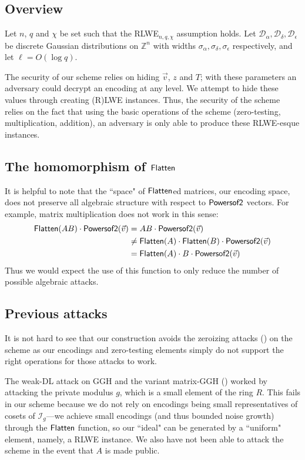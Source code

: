 \subsection{Overview}

Let $n$, $q$ and $\chi$ be set such that the RLWE$_{n,q,\chi}$ assumption holds.  Let $\mathcal{D}_\alpha, \mathcal{D}_\delta, \mathcal{D}_\epsilon$ be discrete Gaussian distributions on $\mathbb{Z}^n$ with widths $\sigma_\alpha, \sigma_\delta, \sigma_\epsilon$ respectively, and let $\ell = O(\log q)$.  

The security of our scheme relies on hiding $\vec{v}$, $z$ and $T$; with these parameters an adversary could decrypt an encoding at any level.  We attempt to hide these values through creating (R)LWE instances.  Thus, the security of the scheme relies on the fact that using the basic operations of the scheme (zero-testing, multiplication, addition), an adversary is only able to produce these RLWE-esque instances.  

\subsection{The homomorphism of $\mathsf{Flatten}$}

It is helpful to note that the ``space" of $\mathsf{Flatten}$ed matrices, our encoding space, does not preserve all algebraic structure with respect to $\mathsf{Powersof2}$ vectors.  For example, matrix multiplication does not work in this sense:
\begin{align*}
\mathsf{Flatten}(AB)\cdot \mathsf{Powersof2}(\vec{v}) &= AB \cdot \mathsf{Powersof2}(\vec{v})\\
&\not= \mathsf{Flatten}(A)\cdot \mathsf{Flatten}(B)\cdot \mathsf{Powersof2}(\vec{v})\\ 
&= \mathsf{Flatten}(A)\cdot B\cdot \mathsf{Powersof2}(\vec{v})
\end{align*}
Thus we would expect the use of this function to only reduce the number of possible algebraic attacks.

\subsection{Previous attacks}
It is not hard to see that our construction avoids the zeroizing attacks (\cite{chl}) on the \cite{clt} scheme as our encodings and zero-testing elements simply do not support the right operations for those attacks to work.

The weak-DL attack on GGH and the variant matrix-GGH (\cite{cgh, hj}) worked by attacking the private modulus $g$, which is a small element of the ring $R$.  This fails in our scheme because we do not rely on encodings being small representatives of cosets of $\mathcal{I}_g$---we achieve small encodings (and thus bounded noise growth) through the $\mathsf{Flatten}$ function, so our ``ideal" can be generated by a ``uniform" element, namely, a RLWE instance.  We also have not been able to attack the scheme in the event that $A$ is made public.

